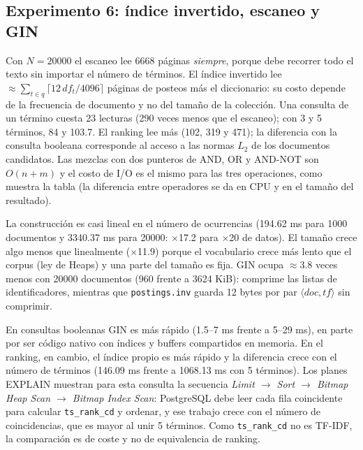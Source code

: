 \documentclass[11pt,a4paper]{article}
\newcommand{\code}[1]{\texttt{#1}}
\begin{document}
\subsection{Experimento 6: índice invertido, escaneo y GIN}
Con $N=20000$ el escaneo lee 6668 páginas \emph{siempre}, porque debe recorrer todo el texto sin importar el número de términos. El índice invertido lee $\approx\sum_{t\in q}\lceil 12\,df_t/4096\rceil$ páginas de posteos más el diccionario: su costo depende de la frecuencia de documento y no del tamaño de la colección. Una consulta de un término cuesta 23 lecturas (290 veces menos que el escaneo); con 3 y 5 términos, 84 y 103.7. El ranking lee más (102, 319 y 471); la diferencia con la consulta booleana corresponde al acceso a las normas $L_2$ de los documentos candidatos. Las mezclas con dos punteros de AND, OR y AND-NOT son $O(n+m)$ y el costo de I/O es el mismo para las tres operaciones, como muestra la tabla (la diferencia entre operadores se da en CPU y en el tamaño del resultado).

La construcción es casi lineal en el número de ocurrencias (194.62 ms para 1000 documentos y 3340.37 ms para 20000: $\times$17.2 para $\times$20 de datos). El tamaño crece algo menos que linealmente ($\times$11.9) porque el vocabulario crece más lento que el corpus (ley de Heaps) y una parte del tamaño es fija. GIN ocupa $\approx$3.8 veces menos con 20000 documentos (960 frente a 3624 KiB): comprime las listas de identificadores, mientras que \code{postings.inv} guarda 12 bytes por par $\langle doc,tf\rangle$ sin comprimir.

En consultas booleanas GIN es más rápido (1.5--7 ms frente a 5--29 ms), en parte por ser código nativo con índices y buffers compartidos en memoria. En el ranking, en cambio, el índice propio es más rápido y la diferencia crece con el número de términos (146.09 ms frente a 1068.13 ms con 5 términos). Los planes EXPLAIN muestran para esta consulta la secuencia \emph{Limit $\rightarrow$ Sort $\rightarrow$ Bitmap Heap Scan $\rightarrow$ Bitmap Index Scan}: PostgreSQL debe leer cada fila coincidente para calcular \code{ts\_rank\_cd} y ordenar, y ese trabajo crece con el número de coincidencias, que es mayor al unir 5 términos. Como \code{ts\_rank\_cd} no es TF-IDF, la comparación es de coste y no de equivalencia de ranking.
\end{document}
